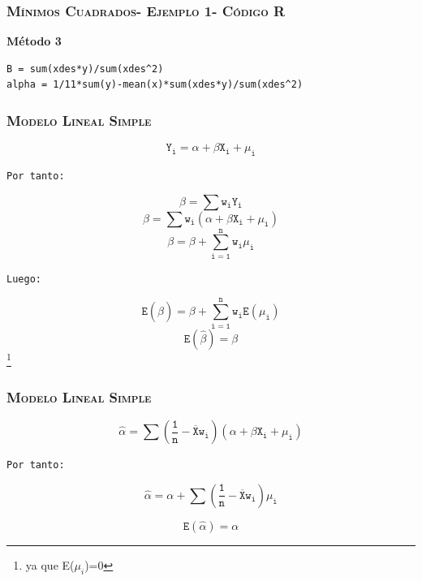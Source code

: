\documentclass[16.5pt]{beamer}
\begin{document}
{
\begin{frame}
\frametitle{\textsc{Mínimos Cuadrados- Ejemplo 1- Código R}}

\textbf{Método 3}
\begin{lstlisting}
B = sum(xdes*y)/sum(xdes^2)
alpha = 1/11*sum(y)-mean(x)*sum(xdes*y)/sum(xdes^2)

\end{lstlisting}

\end{frame}
}
{
\begin{frame}
\frametitle{\textsc{Modelo Lineal Simple}}
\hspace*{-5mm}
\vspace*{-5mm} 


$$\mathtt{ Y_i = \alpha + \beta X_i + \mu_i}$$

\texttt{Por tanto: }

$$\mathtt{ \beta = \sum w_i Y_i}$$
 $$\mathtt{ \beta = \sum w_i ( \alpha + \beta X_i + \mu_i)}$$
 $$\mathtt{ \beta = \beta + \sum_{i=1}^n w_i\mu_i}$$

\texttt{Luego: }

 $$\mathtt{E(\hat \beta) = \beta + \sum_{i=1}^n w_i E(\mu_i)}$$
 $$\mathtt{E(\hat \beta) = \beta} $$\footnote{ya que E($\mu_i$)=0}

\end{frame}
}

{
\begin{frame}
\frametitle{\textsc{Modelo Lineal Simple}}
\hspace*{-5mm}
\vspace*{-5mm} 


$$\mathtt{ \hat\alpha = \sum(\frac{1}{n}-\overline{X}w_i)(\alpha +\beta X_i + \mu_i)}$$

\texttt{Por tanto: }

$$\mathtt{ \hat\alpha = \alpha + \sum(\frac{1}{n}-\overline{X}w_i)\mu_i}$$

$$\mathtt{E(\hat\alpha) = \alpha }$$


\end{frame}
}
\end{document}
